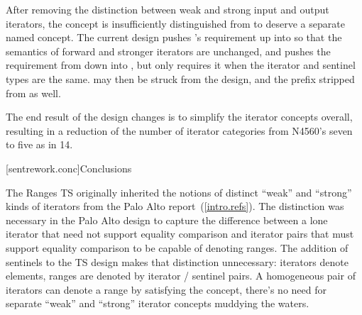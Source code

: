 \pnum
After removing the distinction between weak and strong input and output
iterators, the  concept is insufficiently distinguished from
 to deserve a separate named concept. The current design pushes
's  requirement up into
 so that the semantics of forward and stronger iterators
are unchanged, and pushes the  requirement from
 down into , but only requires it when the
iterator and sentinel types are the same.  may then be struck
from the design, and the  prefix stripped from 
as well.

\pnum
The end result of the design changes is to simplify the iterator concepts
overall, resulting in a reduction of the number of iterator categories from
N4560's seven to five as in \Cpp{}14.

[sentrework.conc]{Conclusions}

\pnum
The Ranges TS originally inherited the notions of distinct ``weak'' and
``strong'' kinds of iterators from the Palo Alto report~(\ref{intro.refs}).
The distinction was necessary in the Palo Alto design to capture the difference
between a lone iterator that need not support equality comparison and iterator
pairs that must support equality comparison to be capable of denoting ranges.
The addition of sentinels to the TS design makes that distinction unnecessary:
iterators denote elements, ranges are denoted by iterator / sentinel pairs. A
homogeneous pair of iterators can denote a range by satisfying the
 concept, there's no need for separate ``weak'' and
``strong'' iterator concepts muddying the waters.

